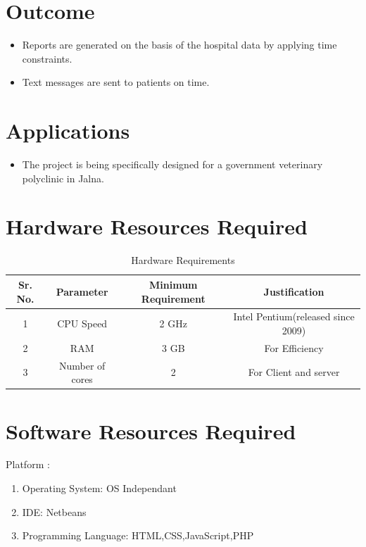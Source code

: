 \documentclass[oneside,a4paper,12pt]{book}
\begin{document}
\section{Outcome}
\begin{itemize}
\item Reports are generated on the basis of the hospital data by applying time constraints.
\item Text messages are sent to patients on time.
\end{itemize}

\section{Applications}
\begin{itemize}
\item The project is being specifically designed for a government veterinary polyclinic in Jalna.
\end{itemize}

\section{Hardware Resources Required}
\begin{table}[!htbp]
\begin{center}
\def\arraystretch{1.5}
  \begin{tabular}{| c | c | c | c |}
\hline
Sr. No. &	Parameter &	Minimum Requirement & Justification \\
\hline
1 &	CPU Speed &	 2 GHz  & Intel Pentium(released since 2009)\\
\hline
2 &	RAM  &	3 GB &  For Efficiency\\
\hline
3 & Number of cores & 2 & For Client and server\\
 \hline
\end{tabular}
 \caption { Hardware Requirements }
 \label{tab:hreq}
\end{center}

\end{table}


\section{Software Resources Required}
Platform : 
\begin{enumerate}
\item Operating System: OS Independant
\item IDE: Netbeans
\item Programming Language: HTML,CSS,JavaScript,PHP
\end{enumerate}
\end{document}
